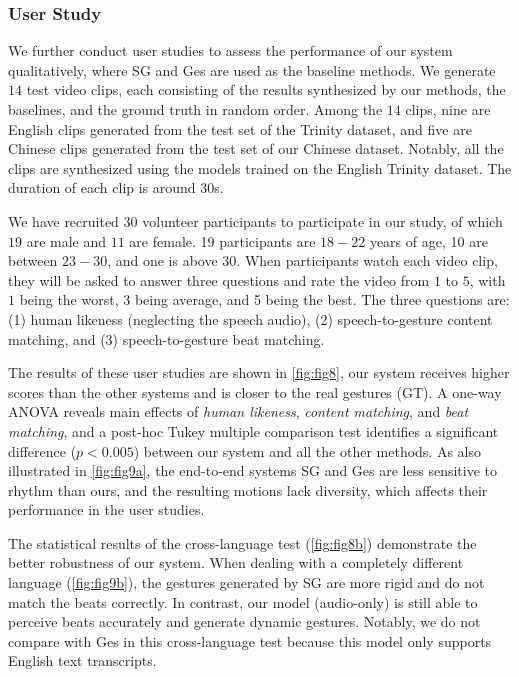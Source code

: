 \subsubsection{User Study}
\label{subsubsec:user_study}
We further conduct user studies to assess the performance of our system qualitatively, where SG \cite{alexanderson2020style} and Ges \cite{kucherenko2020gesticulator} are used as the baseline methods. 
We generate $14$ test video clips, each consisting of the results synthesized by our methods, the baselines, and the ground truth in random order. Among the $14$ clips, nine are English clips generated from the test set of the Trinity dataset, and five are Chinese clips generated from the test set of our Chinese dataset. Notably, all the clips are synthesized using the models trained on the English Trinity dataset. The duration of each clip is around $30$s. 

We have recruited $30$ volunteer participants to participate in our study, of which $19$ are male and $11$ are female. 19 participants are $18-22$ years of age, 10 are between $23-30$, and one is above $30$. When participants watch each video clip, they will be asked to answer three questions and rate the video from $1$ to $5$, with $1$ being the worst, $3$ being average, and 5 being the best. The three questions are: (1) human likeness (neglecting the speech audio), (2) speech-to-gesture content matching, and (3) speech-to-gesture beat matching. 

The results of these user studies are shown in \fig\ref{fig:fig8}, our system receives higher scores than the other systems and is closer to the real gestures (GT). A one-way ANOVA reveals main effects of \emph{human likeness}, \emph{content matching}, and \emph{beat matching}, and a post-hoc Tukey multiple comparison test identifies a significant difference ($p < 0.005$) between our system and all the other methods. 
%
As also illustrated in \fig\ref{fig:fig9a}, the end-to-end systems SG and Ges are less sensitive to rhythm than ours, and the resulting motions lack diversity, which affects their performance in the user studies.

The statistical results of the cross-language test (\fig\ref{fig:fig8b}) demonstrate the better robustness of our system. When dealing with a completely different language (\fig\ref{fig:fig9b}), the gestures generated by SG are more rigid and do not match the beats correctly. In contrast, our model (audio-only) is still able to perceive beats accurately and generate dynamic gestures. Notably, we do not compare with Ges in this cross-language test because this model only supports English text transcripts. 


